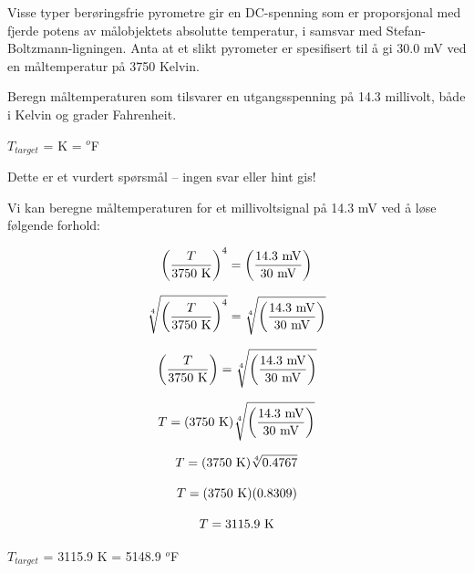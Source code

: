 

Visse typer berøringsfrie pyrometre gir en DC-spenning som er proporsjonal med fjerde potens av målobjektets absolutte temperatur, i samsvar med Stefan-Boltzmann-ligningen.  Anta at et slikt pyrometer er spesifisert til å gi 30.0 mV ved en måltemperatur på 3750 Kelvin.

Beregn måltemperaturen som tilsvarer en utgangsspenning på 14.3 millivolt, både i Kelvin og grader Fahrenheit.

\vskip 10pt

$T_{target}$ = \underbar{\hskip 50pt} K = \underbar{\hskip 50pt} $^{o}$F

\vfil 

\eject






Dette er et vurdert spørsmål -- ingen svar eller hint gis!







Vi kan beregne måltemperaturen for et millivoltsignal på 14.3 mV ved å løse følgende forhold:

$$\left(T \over 3750 \hbox{ K} \right)^4 = \left(14.3 \hbox{ mV} \over 30 \hbox{ mV}  \right)$$

$$\root 4 \of {\left(T \over 3750 \hbox{ K} \right)^4} = \root 4 \of {\left(14.3 \hbox{ mV} \over 30 \hbox{ mV}  \right)}$$

$$\left(T \over 3750 \hbox{ K} \right) = \root 4 \of {\left(14.3 \hbox{ mV} \over 30 \hbox{ mV}  \right)}$$

$$T = (3750 \hbox{ K}) \root 4 \of {\left(14.3 \hbox{ mV} \over 30 \hbox{ mV} \right)}$$

$$T = (3750 \hbox{ K}) \root 4 \of {0.4767}$$

$$T = (3750 \hbox{ K}) (0.8309)$$

$$T = 3115.9 \hbox{ K}$$

$T_{target}$ = 3115.9 K = 5148.9 $^{o}$F


